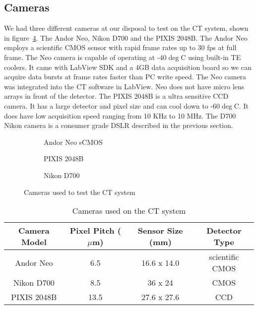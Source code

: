\subsection{Cameras}
We had three different cameras at our disposal to test on the CT system, shown in figure~\ref{fig:cameras}.  The Andor Neo, Nikon D700 and the PIXIS 2048B.  The Andor Neo employs a scientific CMOS sensor with rapid frame rates up to 30 fps at full frame.  The Neo camera is capable of operating at -40$\deg$C using built-in TE coolers.  It came with LabView SDK and a 4GB data acquisition board so we can acquire data bursts at frame rates faster than PC write speed.  The Neo camera was integrated into the CT software in LabView. Neo does not have micro lens arrays in front of the detector.  
The PIXIS 2048B is a ultra sensitive CCD camera.  It has a large detector and pixel size and can cool down to -60$\deg$C.  It does have low acquisition speed ranging from 10 KHz to 10 MHz.  The D700 Nikon camera is a consumer grade DSLR described in the previous section.


\begin{figure}
\centering
	\begin{subfigure}[b]{0.3\linewidth}
	\caption{Andor Neo sCMOS}
	\label{fig:neo}
	\end{subfigure}
\hspace{0.2cm}	
	\begin{subfigure}[b]{0.3\linewidth}
	\caption{PIXIS 2048B}
	\label{fig:pixis}
	\end{subfigure}
\hspace{0.2cm}
	\begin{subfigure}[b]{0.3\linewidth}
	\caption{Nikon D700}
	\label{fig:nikonD700}
	\end{subfigure}
\caption{Cameras used to test the CT system}
\label{fig:cameras}
\end{figure}



\begin{table}
\begin{center}
\begin{tabular}{c|c|c|c}
\hline
Camera Model & Pixel Pitch ($\mu$m) & Sensor Size (mm) & Detector Type \\ \hline
Andor Neo & 6.5 & 16.6 x 14.0 & scientific CMOS \\ \hline
Nikon D700 & 8.5 & 36 x 24 & CMOS \\ \hline
PIXIS 2048B & 13.5 & 27.6 x 27.6 & CCD \\
\hline
\end{tabular}
\caption{Cameras used on the CT system}
\label{table:cameras}
\end{center}
\end{table}

